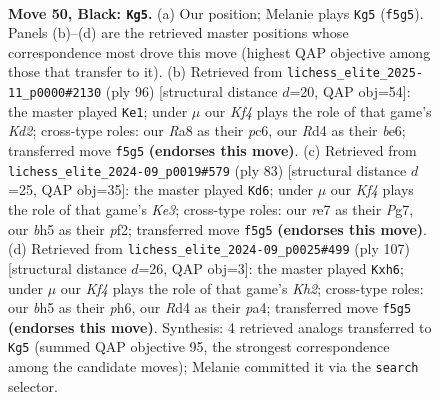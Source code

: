 \documentclass[11pt]{article}
\begin{document}
\clearpage

\begin{figure}[p]\centering
\begin{subfigure}{0.46\textwidth}\centering
\resizebox{\linewidth}{!}{%
\newchessgame
\chessboard[
  setfen={r7/4R3/pp6/5k1B/bP1r4/P6K/8/5R2 b - - 3 50},
  showmover=false,
  pgfstyle=straightmove, color=movearrow, markmove={f5-g5}
]}
\caption{}
\end{subfigure}\hfill
\begin{subfigure}{0.46\textwidth}\centering
\resizebox{\linewidth}{!}{%
\newchessgame
\chessboard[
  setfen={8/R5PB/2p1b3/pp6/3k4/P7/1P1K2r1/8 w - - 5 49},
  showmover=false,
  pgfstyle=straightmove, color=movearrow, markmove={d2-e1}
]}
\caption{}
\end{subfigure}
\\[4pt]
\begin{subfigure}{0.46\textwidth}\centering
\resizebox{\linewidth}{!}{%
\newchessgame
\chessboard[
  setfen={8/p1r3p1/4k3/P6p/4R3/1r5P/5PK1/8 b - - 3 42},
  showmover=false,
  pgfstyle=straightmove, color=movearrow, markmove={e6-d6}
]}
\caption{}
\end{subfigure}\hfill
\begin{subfigure}{0.46\textwidth}\centering
\resizebox{\linewidth}{!}{%
\newchessgame
\chessboard[
  setfen={8/7k/7P/p7/Pp5K/1P6/5pr1/5R2 b - - 7 54},
  showmover=false,
  pgfstyle=straightmove, color=movearrow, markmove={h7-h6}
]}
\caption{}
\end{subfigure}
\caption{\textbf{Move 50, Black: \texttt{Kg5}.} (a) Our position; Melanie plays \texttt{Kg5} (\texttt{f5g5}). Panels (b)--(d) are the retrieved master positions whose correspondence most drove this move (highest QAP objective among those that transfer to it). (b) Retrieved from \texttt{lichess\_elite\_2025-11\_p0000\#2130} (ply 96) [structural distance $d$=20, QAP obj=54]: the master played \texttt{Ke1}; under $\mu$ our \emph{Kf4} plays the role of that game's \emph{Kd2}; cross-type roles: our \emph{R}a8 as their \emph{p}c6, our \emph{R}d4 as their \emph{b}e6; transferred move \texttt{f5g5} \textbf{(endorses this move)}. (c) Retrieved from \texttt{lichess\_elite\_2024-09\_p0019\#579} (ply 83) [structural distance $d$=25, QAP obj=35]: the master played \texttt{Kd6}; under $\mu$ our \emph{Kf4} plays the role of that game's \emph{Ke3}; cross-type roles: our \emph{r}e7 as their \emph{P}g7, our \emph{b}h5 as their \emph{p}f2; transferred move \texttt{f5g5} \textbf{(endorses this move)}. (d) Retrieved from \texttt{lichess\_elite\_2024-09\_p0025\#499} (ply 107) [structural distance $d$=26, QAP obj=3]: the master played \texttt{Kxh6}; under $\mu$ our \emph{Kf4} plays the role of that game's \emph{Kh2}; cross-type roles: our \emph{b}h5 as their \emph{p}h6, our \emph{R}d4 as their \emph{p}a4; transferred move \texttt{f5g5} \textbf{(endorses this move)}. Synthesis: 4 retrieved analogs transferred to \texttt{Kg5} (summed QAP objective 95, the strongest correspondence among the candidate moves); Melanie committed it via the \texttt{search} selector.}
\label{fig:thought-m99}
\end{figure}
\end{document}
